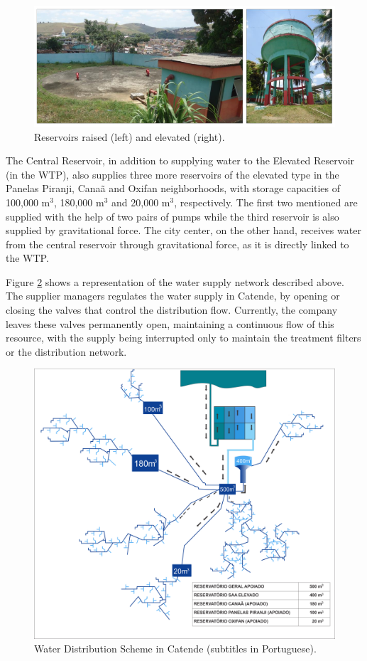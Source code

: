 \documentclass{singlecol}
\theoremstyle{TH}{
\newtheorem{lemma}{Lemma}
\newtheorem{theorem}[lemma]{Theorem}
\newtheorem{corrolary}[lemma]{Corrolary}
\newtheorem{conjecture}[lemma]{Conjecture}
\newtheorem{proposition}[lemma]{Proposition}
\newtheorem{claim}[lemma]{Claim}
\newtheorem{stheorem}[lemma]{Wrong Theorem}
\newtheorem{algorithm}{Algorithm}
}
\theoremstyle{THrm}{
\newtheorem{definition}{Definition}[section]
\newtheorem{question}{Question}[section]
\newtheorem{remark}{Remark}
\newtheorem{scheme}{Scheme}
}
\theoremstyle{THhit}{
\newtheorem{case}{Case}[section]
}
\begin{document}
\begin{figure}[h]
\caption{Reservoirs raised (left) and elevated (right).} 
\label{fig:reservoiresCatende}
\centering
\includegraphics[width=\textwidth]{figures/reservoirs.png}
\end{figure}

The Central Reservoir, in addition to supplying water to the Elevated Reservoir (in the WTP), also supplies three more reservoirs of the elevated type in the Panelas Piranji, Canaã and Oxifan neighborhoods, with storage capacities of 100,000 m$^3$, 180,000 m$^3$ and 20,000 m$^3$, respectively. The first two mentioned are supplied with the help of two pairs of pumps while the third reservoir is also supplied by gravitational force. The city center, on the other hand, receives water from the central reservoir through gravitational force, as it is directly linked to the WTP. 

Figure \ref{fig:WDSCatende} shows a representation of the water supply network described above. The supplier managers regulates the water supply in Catende, by opening or closing the valves that control the distribution flow. Currently, the company leaves these valves permanently open, maintaining a continuous flow of this resource, with the supply being interrupted only to maintain the treatment filters or the distribution network. 

\begin{figure}[h]
\caption{Water Distribution Scheme in Catende  (subtitles in Portuguese).}
\label{fig:WDSCatende}
\centering
\includegraphics[width=\textwidth]{figures/esquemaDist.png}
\end{figure}
 
\end{document}
